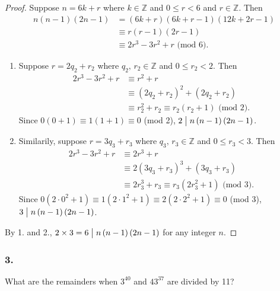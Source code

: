\begin{proof}
    Suppose $n=6k+r$ where $k \in \mathbb{Z}$ and $0 \leq r < 6$ and $r \in \mathbb{Z}$.
    Then
    \begin{align*}
        n\left(n-1\right)\left(2n-1\right) &= \left(6k+r\right)\left(6k+r-1\right)\left(12k+2r-1\right) \\
        &\equiv r\left(r-1\right)\left(2r-1\right) \\
        &\equiv 2r^3-3r^2+r \mbox{ (mod 6)}.
    \end{align*}
    \begin{enumerate}
        \item Suppose $r=2q_2+r_2$ where $q_2,\,r_2 \in \mathbb{Z}$ and $0\leq r_2<2$. Then
        \begin{align*}
            2r^3-3r^2+r &\equiv r^2 + r \\
            &\equiv \left(2q_2+r_2\right)^2 + \left(2q_2+r_2\right) \\
            &\equiv r_2^2 + r_2 \equiv r_2\left(r_2+1\right) \mbox{ (mod 2)}.
        \end{align*}
        Since $0\left(0+1\right) \equiv 1\left(1+1\right) \equiv 0$ (mod 2),
        $2 \bigm| n\left(n-1\right)\left(2n-1\right)$.
        \item Similarily, suppose $r=3q_3+r_3$ where $q_3,\,r_3 \in \mathbb{Z}$ and $0\leq r_3<3$. Then
        \begin{align*}
            2r^3-3r^2+r &\equiv 2r^3 + r \\
            &\equiv 2\left(3q_3+r_3\right)^3 + \left(3q_3+r_3\right) \\
            &\equiv 2r_3^3 + r_3 \equiv r_3\left(2r_3^2+1\right) \mbox{ (mod 3)}.
        \end{align*}
        Since $0\left(2\cdot 0^2+1\right) \equiv 1\left(2\cdot 1^2+1\right) \equiv 2\left(2\cdot 2^2+1\right) \equiv 0$ (mod 3),
        $3 \bigm| n\left(n-1\right)\left(2n-1\right)$.
    \end{enumerate}
    By 1. and 2., $2\times 3 = 6 \bigm| n\left(n-1\right)\left(2n-1\right)$ for any integer $n$.
\end{proof}

\subsubsection{3.} What are the remainders when $3^{40}$ and $43^{37}$
are divided by 11?

